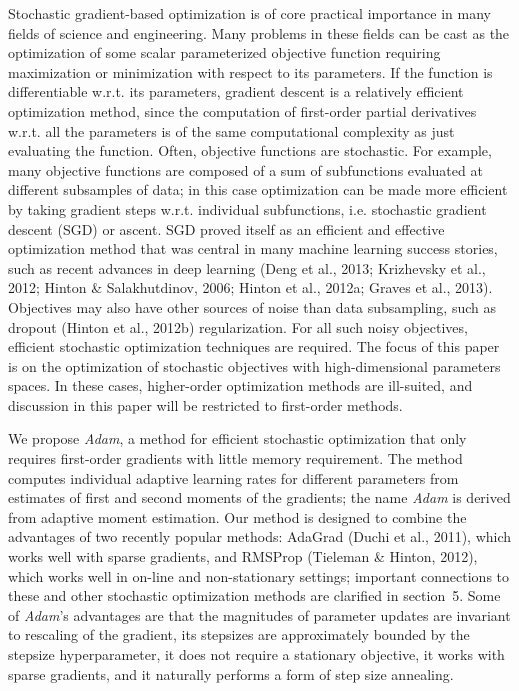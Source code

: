 \documentclass[11pt]{article}
\begin{document}
Stochastic gradient-based optimization is of core practical importance
in many fields of science and engineering. Many problems in these
fields can be cast as the optimization of some scalar parameterized
objective function requiring maximization or minimization with respect
to its parameters. If the function is differentiable w.r.t. its
parameters, gradient descent is a relatively efficient optimization
method, since the computation of first-order partial derivatives
w.r.t. all the parameters is of the same computational complexity as
just evaluating the function. Often, objective functions are
stochastic. For example, many objective functions are composed of a
sum of subfunctions evaluated at different subsamples of data; in this
case optimization can be made more efficient by taking gradient steps
w.r.t. individual subfunctions, i.e. stochastic gradient descent (SGD)
or ascent. SGD proved itself as an efficient and effective
optimization method that was central in many machine learning success
stories, such as recent advances in deep learning (Deng et al., 2013;
Krizhevsky et al., 2012; Hinton \& Salakhutdinov, 2006; Hinton et al.,
2012a; Graves et al., 2013). Objectives may also have other sources
of noise than data subsampling, such as dropout (Hinton et al.,
2012b) regularization. For all such noisy objectives, efficient
stochastic optimization techniques are required. The focus of this
paper is on the optimization of stochastic objectives with
high-dimensional parameters spaces. In these cases, higher-order
optimization methods are ill-suited, and discussion in this paper
will be restricted to first-order methods.

We propose \emph{Adam}, a method for efficient stochastic optimization
that only requires first-order gradients with little memory
requirement. The method computes individual adaptive learning rates
for different parameters from estimates of first and second moments
of the gradients; the name \emph{Adam} is derived from adaptive
moment estimation. Our method is designed to combine the advantages
of two recently popular methods: AdaGrad (Duchi et al., 2011), which
works well with sparse gradients, and RMSProp (Tieleman \& Hinton,
2012), which works well in on-line and non-stationary settings;
important connections to these and other stochastic optimization
methods are clarified in section~5. Some of \emph{Adam}'s advantages
are that the magnitudes of parameter updates are invariant to
rescaling of the gradient, its stepsizes are approximately bounded by
the stepsize hyperparameter, it does not require a stationary
objective, it works with sparse gradients, and it naturally performs
a form of step size annealing.
\end{document}
